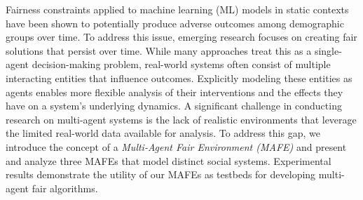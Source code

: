 Fairness constraints applied to machine learning (ML) models in static contexts have been shown to potentially produce adverse outcomes among demographic groups over time. To address this issue, emerging research focuses on creating fair solutions that persist over time. While many approaches treat this as a single-agent decision-making problem, real-world systems often consist of multiple interacting entities that influence outcomes. Explicitly modeling these entities as agents enables more flexible analysis of their interventions and the effects they have on a system's underlying dynamics. A significant challenge in conducting research on multi-agent systems is the lack of realistic environments that leverage the limited real-world data available for analysis. To address this gap, we introduce the concept of a \textit{Multi-Agent Fair Environment (MAFE)} and present and analyze three MAFEs that model distinct social systems. Experimental results demonstrate the utility of our MAFEs as testbeds for developing multi-agent fair algorithms.